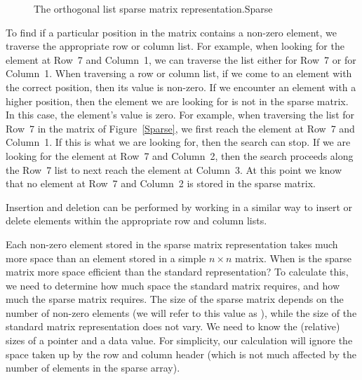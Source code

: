 \begin{figure}
\vspace{-\bigskipamount}\vspace{-\bigskipamount}\vspace{-\medskipamount}
{The orthogonal list sparse matrix representation.}{Sparse}
\vspace{-\smallskipamount}
\end{figure}

To find if a particular position in the matrix contains a non-zero
element, we traverse the appropriate row or column list.
For example, when looking for the element at Row~7 and Column~1,
we can traverse the list either for Row~7 or for Column~1.
When traversing a row or column list, if we come to an element with
the correct position, then its value is non-zero.
If we encounter an element with a higher position,
then the element we are looking for is not in the sparse matrix.
In this case, the element's value is zero.
For example, when traversing the list for Row~7 in the matrix of
Figure~\ref{Sparse}, we first reach the element at Row~7 and Column~1.
If this is what we are looking for, then the search can stop.
If we are looking for the element at Row~7 and Column~2, then the
search proceeds along the Row~7 list to next reach the element at
Column~3.
At this point we know that no element at Row~7 and Column~2 is stored
in the sparse matrix.

Insertion and deletion can be performed by working in a similar way to
insert or delete elements within the appropriate row and column lists.

Each non-zero element stored in the sparse matrix representation
takes much more space than an element stored in a simple $n \times n$
matrix.
When is the sparse matrix more space efficient than the standard
representation?
To calculate this, we need to determine how much space the standard
matrix requires, and how much the sparse matrix requires.
The size of the sparse matrix depends on the number of non-zero
elements (we will refer to this value as ), while the size
of the standard matrix representation does not vary.
We need to know the (relative) sizes of a pointer and a data value.
For simplicity, our calculation will ignore the space taken up by the
row and column header (which is not much affected by the number of
elements in the sparse array).

